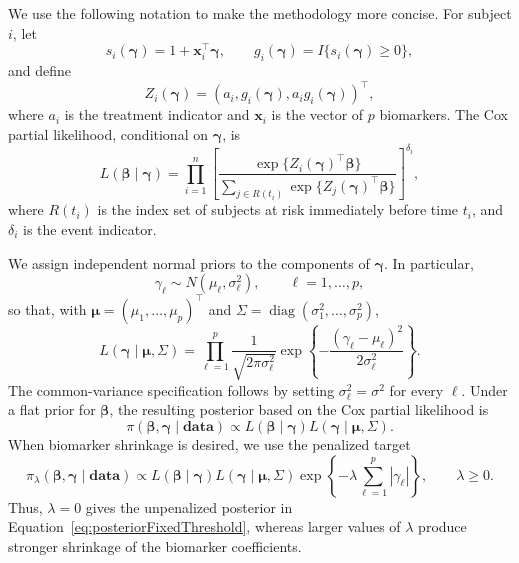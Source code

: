 We use the following notation to make the methodology more concise. For
subject $i$, let
\[
    s_i(\boldsymbol\gamma)
    =
    1+\mathbf{x}_i^\top\boldsymbol\gamma,
    \qquad
    g_i(\boldsymbol\gamma)
    =
    I\{s_i(\boldsymbol\gamma)\geq 0\},
\]
and define
\[
    Z_i(\boldsymbol\gamma)
    =
    \left(
        a_i,
        g_i(\boldsymbol\gamma),
        a_i g_i(\boldsymbol\gamma)
    \right)^\top,
\]
where $a_i$ is the treatment indicator and $\mathbf{x}_i$ is the vector of
$p$ biomarkers. The Cox partial likelihood, conditional on
$\boldsymbol\gamma$, is
\begin{equation}
\label{eq:partialLikFixedThreshold}
    L(\boldsymbol\beta\mid\boldsymbol\gamma)
    =
    \prod_{i=1}^{n}
    \left[
        \frac{
            \exp\{Z_i(\boldsymbol\gamma)^\top\boldsymbol\beta\}
        }{
            \displaystyle\sum_{j\in R(t_i)}
            \exp\{Z_j(\boldsymbol\gamma)^\top\boldsymbol\beta\}
        }
    \right]^{\delta_i},
\end{equation}
where $R(t_i)$ is the index set of subjects at risk immediately before time
$t_i$, and $\delta_i$ is the event indicator.

We assign independent normal priors to the components of
$\boldsymbol\gamma$. In particular,
\[
    \gamma_\ell\sim N(\mu_\ell,\sigma_\ell^2),
    \qquad \ell=1,\ldots,p,
\]
so that, with
$\boldsymbol\mu=(\mu_1,\ldots,\mu_p)^\top$ and
$\Sigma=\operatorname{diag}(\sigma_1^2,\ldots,\sigma_p^2)$,
\begin{equation}
\label{eq:gammaPriorFixedThreshold}
    L(\boldsymbol\gamma\mid\boldsymbol\mu,\Sigma)
    =
    \prod_{\ell=1}^{p}
    \frac{1}{\sqrt{2\pi\sigma_\ell^2}}
    \exp\left\{
        -\frac{(\gamma_\ell-\mu_\ell)^2}{2\sigma_\ell^2}
    \right\}.
\end{equation}
The common-variance specification follows by setting
$\sigma_\ell^2=\sigma^2$ for every $\ell$. Under a flat prior for
$\boldsymbol\beta$, the resulting posterior based on the Cox partial
likelihood is
\begin{equation}
\label{eq:posteriorFixedThreshold}
    \pi(\boldsymbol\beta,\boldsymbol\gamma\mid\textbf{data})
    \propto
    L(\boldsymbol\beta\mid\boldsymbol\gamma)
    L(\boldsymbol\gamma\mid\boldsymbol\mu,\Sigma).
\end{equation}
When biomarker shrinkage is desired, we use the penalized target
\begin{equation}
\label{eq:penalizedPosteriorFixedThreshold}
    \pi_\lambda(\boldsymbol\beta,\boldsymbol\gamma
    \mid\textbf{data})
    \propto
    L(\boldsymbol\beta\mid\boldsymbol\gamma)
    L(\boldsymbol\gamma\mid\boldsymbol\mu,\Sigma)
    \exp\left\{-\lambda\sum_{\ell=1}^{p}|\gamma_\ell|\right\},
    \qquad \lambda\geq 0.
\end{equation}
Thus, $\lambda=0$ gives the unpenalized posterior in
Equation~\ref{eq:posteriorFixedThreshold}, whereas larger values of
$\lambda$ produce stronger shrinkage of the biomarker coefficients.

